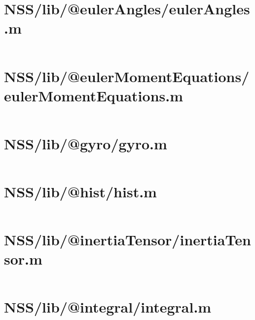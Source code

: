 \pagebreak
\section*{NSS/lib/@eulerAngles/eulerAngles.m}\label{code:NSS/lib/@eulerAngles/eulerAngles.m}
\inputminted[linenos,fontsize=\scriptsize]{matlab}{/home/dcouture/git/mathyourlife/TSatPy/beta_versions/matlab_object_oriented/lib/@eulerAngles/eulerAngles.m}

\pagebreak
\section*{NSS/lib/@eulerMomentEquations/eulerMomentEquations.m}\label{code:NSS/lib/@eulerMomentEquations/eulerMomentEquations.m}
\inputminted[linenos,fontsize=\scriptsize]{matlab}{/home/dcouture/git/mathyourlife/TSatPy/beta_versions/matlab_object_oriented/lib/@eulerMomentEquations/eulerMomentEquations.m}

\pagebreak
\section*{NSS/lib/@gyro/gyro.m}\label{code:NSS/lib/@gyro/gyro.m}
\inputminted[linenos,fontsize=\scriptsize]{matlab}{/home/dcouture/git/mathyourlife/TSatPy/beta_versions/matlab_object_oriented/lib/@gyro/gyro.m}

\pagebreak
\section*{NSS/lib/@hist/hist.m}\label{code:NSS/lib/@hist/hist.m}
\inputminted[linenos,fontsize=\scriptsize]{matlab}{/home/dcouture/git/mathyourlife/TSatPy/beta_versions/matlab_object_oriented/lib/@hist/hist.m}

\pagebreak
\section*{NSS/lib/@inertiaTensor/inertiaTensor.m}\label{code:NSS/lib/@inertiaTensor/inertiaTensor.m}
\inputminted[linenos,fontsize=\scriptsize]{matlab}{/home/dcouture/git/mathyourlife/TSatPy/beta_versions/matlab_object_oriented/lib/@inertiaTensor/inertiaTensor.m}

\pagebreak
\section*{NSS/lib/@integral/integral.m}\label{code:NSS/lib/@integral/integral.m}
\inputminted[linenos,fontsize=\scriptsize]{matlab}{/home/dcouture/git/mathyourlife/TSatPy/beta_versions/matlab_object_oriented/lib/@integral/integral.m}

